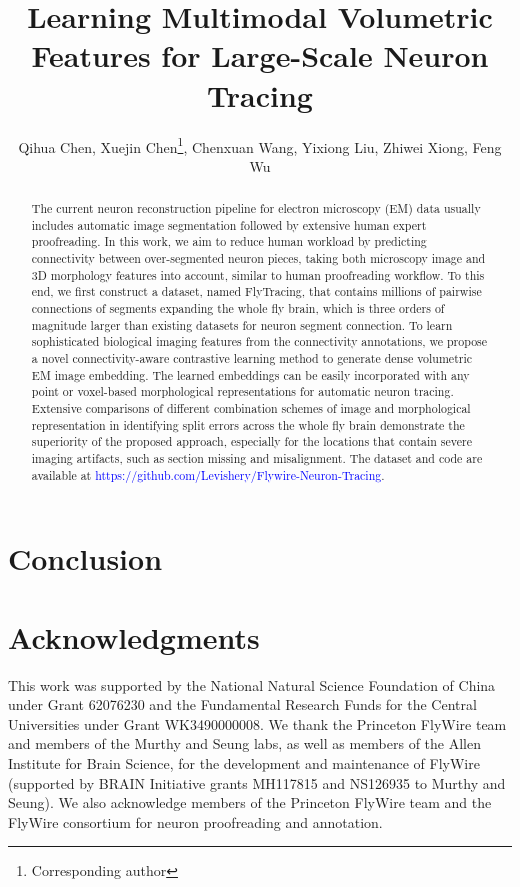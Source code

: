 \documentclass[letterpaper]{article} %
\title{Learning Multimodal Volumetric Features for Large-Scale Neuron Tracing}
\author {
    Qihua Chen,
    Xuejin Chen\thanks{ Corresponding author},
    Chenxuan Wang,
    Yixiong Liu,
    Zhiwei Xiong,
    Feng Wu
}
\begin{document}
\maketitle

\begin{abstract}
The current neuron reconstruction pipeline for electron microscopy (EM) data usually includes automatic image segmentation followed by extensive human expert proofreading. In this work, we aim to reduce human workload by predicting connectivity between over-segmented neuron pieces, taking both microscopy image and 3D morphology features into account, similar to human proofreading workflow.
To this end, we first construct a dataset, named FlyTracing, that contains millions of pairwise connections of segments expanding the whole fly brain, which is three orders of magnitude larger than existing datasets for neuron segment connection.
%
To learn sophisticated biological imaging features from the connectivity annotations, we propose a novel connectivity-aware contrastive learning method to generate dense volumetric EM image embedding. The learned embeddings can be easily incorporated with any point or voxel-based morphological representations for automatic neuron tracing.
Extensive comparisons of different combination schemes of image and morphological representation in identifying split errors across the whole fly brain demonstrate the superiority of the proposed approach, especially for the locations that contain severe imaging artifacts, such as section missing and misalignment. The dataset and code are available at \textcolor{blue}{https://github.com/Levishery/Flywire-Neuron-Tracing}.
\end{abstract}


 





\section{Conclusion}


\section*{Acknowledgments}
This work was supported by the National Natural Science Foundation of China under Grant 62076230 and the Fundamental Research Funds for the Central Universities under Grant WK3490000008.
We thank the Princeton FlyWire team and members of the Murthy and Seung labs, as well as members of the Allen Institute for Brain Science, for the development and maintenance of FlyWire (supported by BRAIN Initiative grants MH117815 and NS126935 to Murthy and Seung). We also acknowledge members of the Princeton FlyWire team and the FlyWire consortium for neuron proofreading and annotation.
\end{document}
